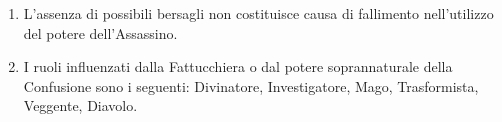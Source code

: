 \documentclass[a4paper,10pt]{article}
\begin{document}
\begin{enumerate}
% 
%
%	
% 
	
	\item L'assenza di possibili bersagli non costituisce causa di fallimento nell'utilizzo del potere dell'Assassino.
	
	\item I ruoli influenzati dalla Fattucchiera o dal potere soprannaturale della Confusione sono i seguenti: Divinatore, Investigatore, Mago, Trasformista, Veggente, Diavolo.
	

\end{enumerate}
\end{document}
